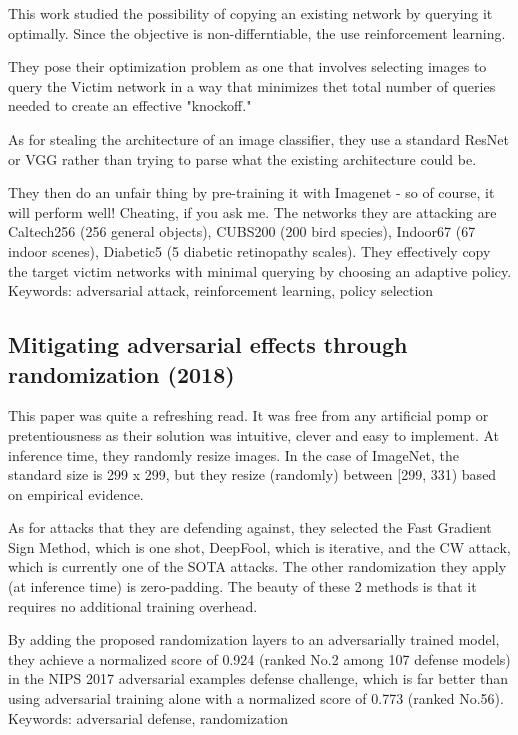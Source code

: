 \documentclass{article}
\begin{document}
This work studied the possibility of copying an existing network by querying it optimally. Since the objective is non-differntiable, the use reinforcement learning.

They pose their optimization problem as one that involves selecting images to query the Victim network in a way that minimizes thet total number of queries needed to create an effective "knockoff."

As for stealing the architecture of an image classifier, they use a standard ResNet or VGG rather than trying to parse what the existing architecture could be.

They then do an unfair thing by pre-training it with Imagenet - so of course, it will perform well! Cheating, if you ask me. The networks they are attacking are Caltech256 (256 general objects), CUBS200 (200 bird species), Indoor67 (67 indoor scenes), Diabetic5 (5 diabetic retinopathy scales). They effectively copy the target victim networks with minimal querying by choosing an adaptive policy.
\newline\newline
Keywords: adversarial attack, reinforcement learning, policy selection

\subsection*{Mitigating adversarial effects through randomization (2018)\cite{xie2017mitigating}}

This paper was quite a refreshing read. It was free from any artificial pomp or pretentiousness as their solution was intuitive, clever and easy to implement. At inference time, they randomly resize images. In the case of ImageNet, the standard size is 299 x 299, but they resize (randomly) between [299, 331) based on empirical evidence.

As for attacks that they are defending against, they selected the Fast Gradient Sign Method, which is one shot, DeepFool, which is iterative, and the CW attack, which is currently one of the SOTA attacks. The other randomization they apply (at inference time) is zero-padding. The beauty of these 2 methods is that it requires no additional training overhead.

By adding the proposed randomization layers to an adversarially trained model, they achieve a normalized score of 0.924 (ranked No.2 among 107 defense models) in the NIPS 2017 adversarial examples defense challenge, which is far better than using adversarial training alone with a normalized score of 0.773 (ranked No.56).
\newline\newline
Keywords: adversarial defense, randomization
\end{document}
